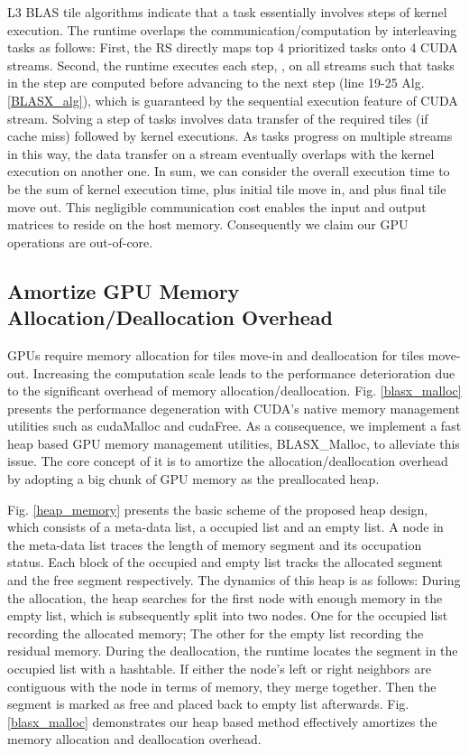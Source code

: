 \documentclass[conference]{IEEEtran}
\begin{document}
L3 BLAS tile algorithms indicate that a task essentially involves  steps of kernel execution.
The runtime overlaps the communication/computation by interleaving tasks as follows: 
First, the RS directly maps top 4 prioritized tasks onto 4 CUDA streams. 
Second, the runtime executes each step, , on all streams such that tasks in the step are computed before 
advancing to the next step (line 19-25 Alg.\ref{BLASX_alg}), which is guaranteed by the sequential execution 
feature of CUDA stream. Solving a step of tasks involves data transfer of the required tiles (if cache miss) followed 
by kernel executions. As tasks progress on multiple streams in this way, the data transfer on a stream eventually overlaps 
with the kernel execution on another one. In sum, we can consider the overall execution time to be the sum of kernel execution time, plus 
initial tile move in, and plus final tile move out. This negligible communication cost enables the input and output matrices to 
reside on the host memory. Consequently we claim our GPU operations are out-of-core.


\vspace{-0.12in}
\subsection{Amortize GPU Memory Allocation/Deallocation Overhead}
\vspace{-0.05in}
GPUs require memory allocation for tiles move-in and deallocation for tiles move-out. 
Increasing the computation scale leads to the performance deterioration due to
the significant overhead of memory allocation/deallocation. Fig. \ref{blasx_malloc} 
presents the performance degeneration with CUDA's native memory management utilities 
such as cudaMalloc and cudaFree. As a consequence, we implement a fast heap based GPU memory 
management utilities, BLASX\_Malloc, to alleviate this issue. The core concept of it is to 
amortize the allocation/deallocation overhead by adopting a big chunk of GPU memory 
as the preallocated heap.

Fig. \ref{heap_memory} presents the basic scheme of the proposed heap design,
which consists of a meta-data list, a occupied list and an empty list. A node 
in the meta-data list traces the length of memory segment and its occupation status. 
Each block of the occupied and empty list tracks the allocated segment and the free segment 
respectively. The dynamics of this heap is as follows:
During the allocation, the heap searches for the first node with enough memory in the empty list, 
which is subsequently split into two nodes. One for the occupied list recording the allocated 
memory; The other for the empty list recording the residual memory. During the deallocation, 
the runtime locates the segment in the occupied list with a hashtable. If either the 
node's left or right neighbors are contiguous with the node in terms of memory, they merge together. 
Then the segment is marked as free and placed back to empty list afterwards.
Fig. \ref{blasx_malloc} demonstrates our heap based method effectively amortizes the memory 
allocation and deallocation overhead.
\end{document}
